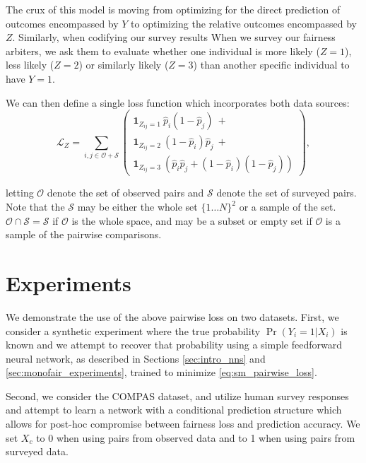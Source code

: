     The crux of this model is moving from optimizing for the direct prediction of outcomes encompassed by $Y$ to optimizing the relative outcomes encompassed by $Z$.  Similarly, when codifying our survey results When we survey our fairness arbiters, we ask them to evaluate whether one individual is more likely ($Z = 1$), less likely ($Z = 2$) or similarly likely ($Z = 3$) than another specific individual to have $Y = 1$.
    
    We can then define a single loss function which incorporates both data sources:
    $$ \mathcal{L}_Z = \sum\limits_{i, j \in \mathcal{O} + \mathcal{S}} \left(\begin{array}{l} 
        \mathbf{1}_{Z_{ij} = 1} ~ \hat{p}_i (1 - \hat{p}_j) ~ + \\
        \mathbf{1}_{Z_{ij} = 2} ~ (1 - \hat{p}_i) \hat{p}_j ~ + \\
        \mathbf{1}_{Z_{ij} = 3} ~ \left(\hat{p}_i \hat{p}_j + (1 - \hat{p}_i)(1 - \hat{p}_j) \right)
    \end{array}\right), \label{eq:sm_pairwise_loss}$$
    
    letting $\mathcal{O}$ denote the set of observed pairs and $\mathcal{S}$ denote the set of surveyed pairs.  Note that the $\mathcal{S}$ may be either the whole set $\{1 \ldots N\}^2$ or a sample of the set.  $\mathcal{O} \cap \mathcal{S} = \mathcal{S}$ if $\mathcal{O}$ is the whole space, and may be a subset or empty set if $\mathcal{O}$ is a sample of the pairwise comparisons.

\section{Experiments}\label{sec:softmono_experiments}

    We demonstrate the use of the above pairwise loss on two datasets.  First, we consider a synthetic experiment where the true probability $\Pr(Y_i = 1 | X_i)$ is known and we attempt to recover that probability using a simple feedforward neural network, as described in Sections \ref{sec:intro_nns} and \ref{sec:monofair_experiments}, trained to minimize \ref{eq:sm_pairwise_loss}.  
    
    Second, we consider the COMPAS dataset, and utilize human survey responses and attempt to learn a network with a conditional prediction structure which allows for post-hoc compromise between fairness loss and prediction accuracy.  We set $X_{c}$ to 0 when using pairs from observed data and to 1 when using pairs from surveyed data.

